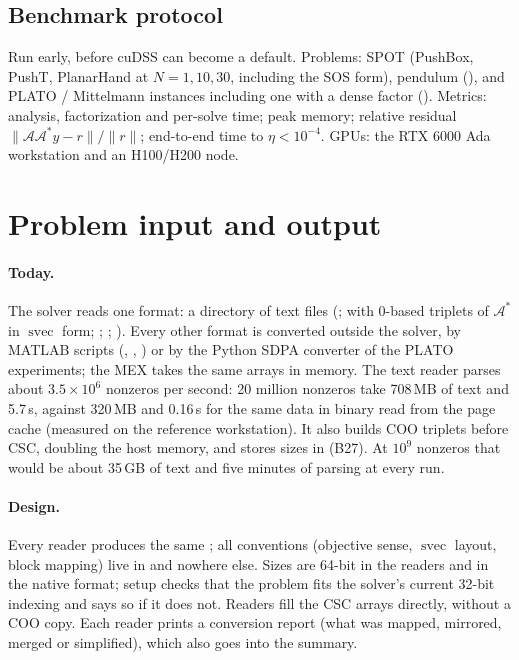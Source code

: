 \documentclass[11pt]{article}
\newcommand{\A}{\mathcal{A}}
\newcommand{\Ad}{\mathcal{A}^{*}}
\newcommand{\norm}[1]{\lVert #1\rVert}
\newcommand{\svec}{\operatorname{svec}}
\begin{document}
\subsection{Benchmark protocol}\label{sec:bench}
Run early, before cuDSS can become a default. Problems: SPOT (PushBox, PushT, PlanarHand at $N=1,10,30$,
including the SOS form), pendulum (), and PLATO / Mittelmann instances including one with a
dense factor (). Metrics: analysis, factorization and per-solve time; peak memory; relative
residual $\norm{\A\Ad y - r}/\norm{r}$; end-to-end time to $\eta<10^{-4}$. GPUs: the RTX 6000 Ada workstation
and an H100/H200 node.

\section{Problem input and output}\label{sec:io}

\paragraph{Today.} The solver reads one format: a directory of text files (;  with
0-based  triplets of $\Ad$ in $\svec$ form; ; ; ). Every
other format is converted outside the solver, by MATLAB scripts (,
, ) or by the Python SDPA converter of the PLATO experiments; the MEX
takes the same arrays in memory. The text reader parses about $3.5\times10^6$ nonzeros per second: 20 million
nonzeros take 708\,MB of text and 5.7\,s, against 320\,MB and 0.16\,s for the same data in binary read from the
page cache (measured on the reference workstation). It also builds COO triplets before CSC, doubling the host
memory, and stores sizes in  (B27). At $10^9$ nonzeros that would be about 35\,GB of text and five
minutes of parsing at every run.

\paragraph{Design.} Every reader produces the same ; all conventions (objective sense, $\svec$
layout, block mapping) live in  and nowhere else. Sizes are 64-bit in the readers and in the native
format; setup checks that the problem fits the solver's current 32-bit indexing and says so if it does not.
Readers fill the CSC arrays directly, without a COO copy. Each reader prints a conversion report (what was
mapped, mirrored, merged or simplified), which also goes into the summary.
\end{document}
